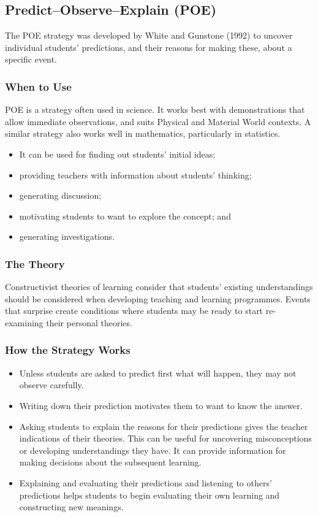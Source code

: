 \subsection*{Predict--Observe--Explain (POE)}
The POE strategy was developed by White and Gunstone (1992) to uncover individual students'
predictions, and their reasons for making these, about a specific event.
\subsubsection*{When to Use}
POE is a strategy often used in science. It works best with demonstrations that allow immediate
observations, and suits Physical and Material World contexts. A similar strategy also works well in
mathematics, particularly in statistics.
\begin{itemize}
\item It can be used for finding out students' initial ideas;
\item providing teachers with information about students' thinking;
\item generating discussion;
\item motivating students to want to explore the concept; and
\item generating investigations.
\end{itemize}
\subsubsection*{The Theory}
Constructivist theories of learning consider that students’ existing understandings should be
considered when developing teaching and learning programmes. Events that surprise create
conditions where students may be ready to start re-examining their personal theories.
\subsubsection*{How the Strategy Works}
\begin{itemize}
\item Unless students are asked to predict first what will happen, they may not observe
carefully.
\item Writing down their prediction motivates them to want to know the answer.
\item Asking students to explain the reasons for their predictions gives the teacher indications
of their theories. This can be useful for uncovering misconceptions or developing
understandings they have. It can provide information for making decisions about the
subsequent learning.
\item Explaining and evaluating their predictions and listening to others' predictions helps
students to begin evaluating their own learning and constructing new meanings.
\end{itemize}
